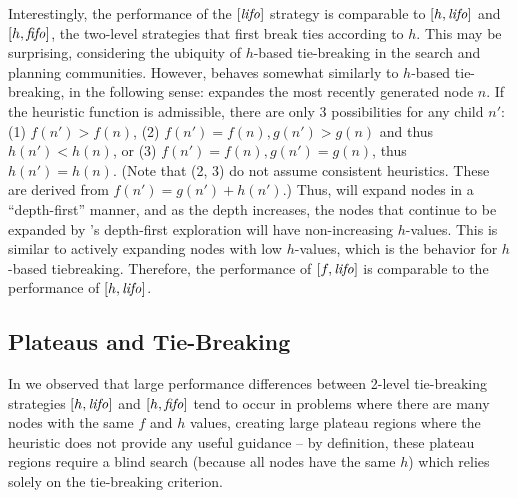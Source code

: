 Interestingly, the performance of the $[\mbox{\textit{lifo}}]$ strategy
is comparable to $[h,\mbox{\textit{lifo}}]$ and $[h,\mbox{\textit{fifo}}]$, the two-level strategies that first break ties according to $h$.
This may be surprising, considering the ubiquity of $h$-based tie-breaking in the search and planning communities.
% 
However, \lifo behaves somewhat similarly to $h$-based tie-breaking, in the following sense:
\lifo expandes the most recently generated node $n$.
If the heuristic function is admissible, there are only 3 possibilities for any child $n'$: 
(1) $f(n') > f(n)$, 
(2) $f(n') = f(n), g(n') > g(n)$ and thus $h(n') < h(n)$, or
(3) $f(n') = f(n), g(n') = g(n)$, thus $h(n') = h(n)$.
(Note that (2, 3) do not assume consistent heuristics.
These are derived from $f(n')=g(n')+h(n')$.)
Thus, \lifo will expand nodes in a ``depth-first'' manner, and as the depth increases,
the nodes that continue to be expanded by \lifo's 
depth-first exploration will have non-increasing $h$-values.
This is similar to actively expanding nodes with low $h$-values, which is the behavior for $h$-based tiebreaking.
Therefore, the performance of $[f,\mbox{\textit{lifo}}]$ is comparable to the performance of $[h,\mbox{\textit{lifo}}]$.


\subsection{Plateaus and Tie-Breaking}

In 
we observed that large performance differences between
2-level tie-breaking strategies $[h,\mbox{\textit{lifo}}]$ and $[h,\mbox{\textit{fifo}}]$ tend
to occur in problems where there are many nodes with the same $f$ and
$h$ values, creating large plateau regions where the heuristic does not
provide any useful guidance -- by definition, these plateau regions 
require a blind search (because all nodes
have the same $h$) which relies solely on the tie-breaking criterion.


